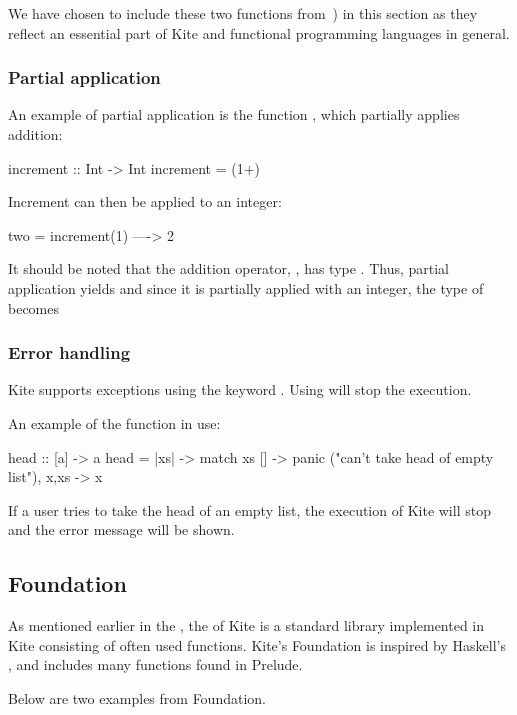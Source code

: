 We have chosen to include these two functions from~) in this section as they reflect an essential part of Kite and functional programming languages in general.

\subsubsection{Partial application}
An example of partial application is the function , which partially applies addition:

\begin{kite}
increment :: Int -> Int
increment = (1+)
\end{kite}

Increment can then be applied to an integer:

\begin{kite}
two = increment(1) ----> 2
\end{kite}

It should be noted that the addition operator, \code{+}, has type . Thus, partial application yields  and since
it is partially applied with an integer, the type of 
becomes 

\subsubsection{Error handling}
Kite supports exceptions using the keyword . Using  will stop the execution.

An example of the  function in use:
\begin{kite}
  head :: [a] -> a
  head = |xs| -> {
    match xs {
      [] -> panic ("can't take head of empty list"),
      x,xs -> x
    }
  }
\end{kite}
If a user tries to take the head of an empty list, the execution of Kite will stop and the error message will be shown.


\subsection{Foundation}
As mentioned earlier in the , the  of Kite is a standard library implemented in Kite consisting of often used functions. Kite's Foundation is inspired by Haskell's , and includes many functions found in
Prelude.

Below are two examples from Foundation.

